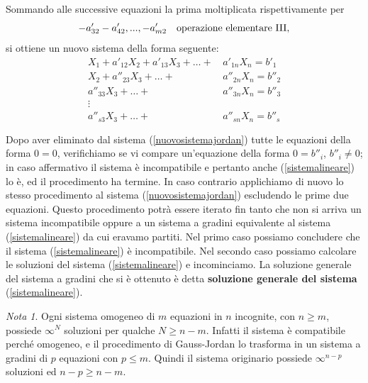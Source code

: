 \documentclass{article}
\theoremstyle{plain}
\theoremstyle{definition}
\theoremstyle{remark}
\newtheorem{note}{Nota}
\begin{document}
Sommando alle successive equazioni la prima moltiplicata rispettivamente per 
\[-a'_{32}-a'_{42},...,-a'_{m2}\quad\textup{operazione elementare III}, \]
si ottiene un nuovo sistema della forma seguente:
\begin{equation}
    \begin{aligned}
        X_1 + a'_{12}X_2 + a'_{13}X_3 + \ldots + \,&a'_{1n}X_n = b'_1 \\
        X_2 + a''_{23}X_3 + \ldots + \,&a''_{2n}X_n = b''_2 \\
        a''_{33}X_3 + \ldots + \,&a''_{3n}X_n = b''_3 \\
        \vdots\quad\;\,& \\
        a''_{s3}X_3 + \ldots + &a''_{sn}X_n = b''_s \\\\
    \end{aligned}\label{nuovosistemajordan}
\end{equation}
Dopo aver eliminato dal sistema (\ref{nuovosistemajordan}) tutte le equazioni della forma \( 0 = 0 \), 
verifichiamo se vi compare un'equazione della forma \( 0 = b''_i \), \( b''_i \neq 0 \); in caso affermativo il sistema è incompatibile e pertanto anche (\ref{sistemalineare}) lo è, ed il procedimento ha termine. 
In caso contrario applichiamo di nuovo lo stesso procedimento al sistema (\ref{nuovosistemajordan}) escludendo le prime due equazioni.
Questo procedimento potrà essere iterato fin tanto che non si arriva un sistema incompatibile oppure a un sistema a gradini equivalente al sistema (\ref{sistemalineare}) da cui eravamo partiti. 
Nel primo caso possiamo concludere che il sistema (\ref{sistemalineare}) è incompatibile. Nel secondo caso possiamo calcolare le soluzioni del sistema (\ref{sistemalineare}) e incominciamo. 
La soluzione generale del sistema a gradini che si è ottenuto è detta \textbf{soluzione generale del sistema} (\ref{sistemalineare}).

\vspace{10pt}

\begin{note}
    Ogni sistema omogeneo di \( m \) equazioni in \( n \) incognite, con \( n \geq m \), possiede \( \infty^N \) soluzioni per qualche \( N \geq n - m \). 
    Infatti il sistema è compatibile perché omogeneo, e il procedimento di Gauss-Jordan lo trasforma in un sistema a gradini di \( p \) equazioni con \( p \leq m \). 
    Quindi il sistema originario possiede \( \infty^{n-p} \) soluzioni ed \( n - p \geq n - m \).
\end{note}
\end{document}
